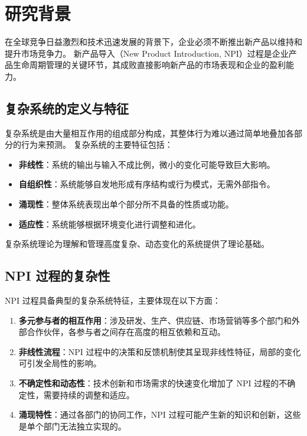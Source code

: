 
\chapter{研究背景}

在全球竞争日益激烈和技术迅速发展的背景下，企业必须不断推出新产品以维持和提升市场竞争力。
新产品导入（New Product Introduction, NPI）过程是企业产品生命周期管理的关键环节，其成败直接影响新产品的市场表现和企业的盈利能力。

\section{复杂系统的定义与特征}

复杂系统是由大量相互作用的组成部分构成，其整体行为难以通过简单地叠加各部分的行为来预测\citep{anderson1972more}。
复杂系统的主要特征包括\citep{mitchell2009complexity}：

\begin{itemize}
  \item \textbf{非线性}：系统的输出与输入不成比例，微小的变化可能导致巨大影响。
  \item \textbf{自组织性}：系统能够自发地形成有序结构或行为模式，无需外部指令。
  \item \textbf{涌现性}：整体系统表现出单个部分所不具备的性质或功能。
  \item \textbf{适应性}：系统能够根据环境变化进行调整和进化。
\end{itemize}

复杂系统理论为理解和管理高度复杂、动态变化的系统提供了理论基础\citep{holland2006studying}。

\section{NPI 过程的复杂性}

NPI 过程具备典型的复杂系统特征，主要体现在以下方面：

\begin{enumerate}
  \item \textbf{多元参与者的相互作用}：涉及研发、生产、供应链、市场营销等多个部门和外部合作伙伴，各参与者之间存在高度的相互依赖和互动\citep{kusumanoKimCLARKTakahiro1992}。
  
  \item \textbf{非线性流程}：NPI 过程中的决策和反馈机制使其呈现非线性特征，局部的变化可引发全局性的影响\citep{wheelwright1992revolutionizing}。
  
  \item \textbf{不确定性和动态性}：技术创新和市场需求的快速变化增加了 NPI 过程的不确定性，需要持续的调整和适应\citep{trent2003international}。
  
  \item \textbf{涌现特性}：通过各部门的协同工作，NPI 过程可能产生新的知识和创新，这些是单个部门无法独立实现的\citep{tidd2013managing}。
\end{enumerate}

